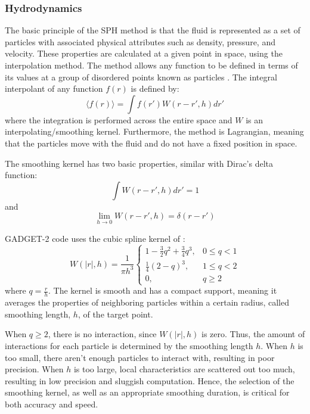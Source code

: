 \subsubsection{Hydrodynamics}

The basic principle of the SPH method is that the fluid is represented as a set of particles with associated physical attributes such as density, pressure, and velocity. These properties are calculated at a given point in space, using the interpolation method. The method allows any function to be defined in terms of its values at a group of disordered points known as particles \citep{monaghan1982particle}. The integral interpolant of any function $f(r)$ is defined by:
\begin{equation}\label{eq:interpolant}
    \langle f(r) \rangle = \int f(r') W(r-r',h) dr'
\end{equation}
where the integration is performed across the entire space and $W$ is an interpolating/smoothing kernel. Furthermore, the method is Lagrangian, meaning that the particles move with the fluid and do not have a fixed position in space.

The smoothing kernel has two basic properties, similar with Dirac's delta function:
\begin{equation}\label{eq:kernel_property_1}
    \int W(r-r',h) dr' = 1
\end{equation}
and
\begin{equation}\label{eq:kernel_property_2}
   \lim_{h\to0} W(r-r',h) = \delta(r-r')
\end{equation}

GADGET-2 code uses the cubic spline kernel of \cite{monaghan1985refined}:
\begin{equation}\label{eq:spline_kernel}
  W(|r|,h) = \frac{1}{\pi h^3}
    \begin{cases}
      1 - \frac{3}{2}q^2 + \frac{3}{4}q^3, & 0 \leq q < 1\\
      \frac{1}{4}(2 - q)^3, & 1 \leq q <2 \\
      0, &  q \geq 2
    \end{cases}       
\end{equation}
where $q = \frac{r}{h}$. The kernel is smooth and has a compact support, meaning it averages the properties of neighboring particles within a certain radius, called smoothing length, $h$, of the target point.  

When $q \geq 2$, there is no interaction, since $W(|r|,h)$ is zero. Thus, the amount of interactions for each particle is determined by the smoothing length $h$. When $h$ is too small, there aren't enough particles to interact with, resulting in poor precision. When $h$ is too large, local characteristics are scattered out too much, resulting in low precision and sluggish computation. Hence, the selection of the smoothing kernel, as well as an appropriate smoothing duration, is critical for both accuracy and speed. 

